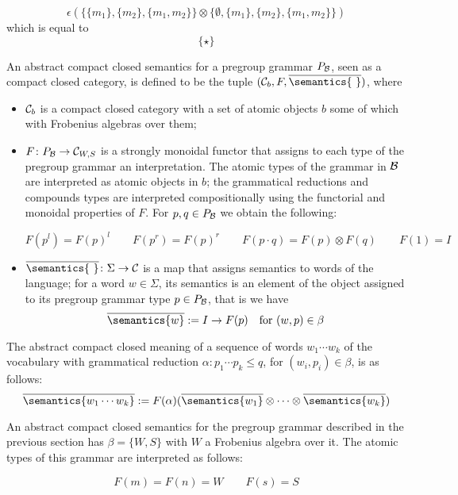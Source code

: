 \[
\epsilon(\{\{m_1\}, \{m_2\}, \{m_1,m_2\}\} \otimes   \{\emptyset, \{m_1\}, \{m_2\}, \{m_1, m_2\}\})
\]
which is equal to 
\[
\{\star\}
\]
 







An abstract compact closed semantics for a pregroup grammar $P_{\cal B}$, seen as a compact closed category,   is defined  to be the tuple $({\cal C}_{b},F, \overline{\semantics{\ }})$, where 
\begin{itemize}
\item ${\cal C}_{b}$ is a compact closed category with  a set of atomic  objects $b$ some of which with  Frobenius algebras over them;
\item $F \colon P_{\cal B} \to {\cal C}_{W, S}$  is a strongly monoidal functor that assigns to each type  of the pregroup grammar an interpretation. The atomic types of the grammar in ${\cal B}$ are interpreted as atomic objects in $b$; the grammatical reductions and compounds types are interpreted compositionally using the functorial and monoidal properties of $F$. For  $p,q \in P_{\cal B}$ we obtain the following:

\[
F(p^l) = F(p)^l \qquad 
F(p^r) = F(p)^r\qquad
F(p \cdot q) = F(p) \otimes F(q)\qquad
F(1) =  I 
\]
\item $\overline{\semantics{\ }} \colon \Sigma \to {\cal C}$ is a map that assigns semantics to  words of the language; for a word  $w  \in \Sigma$, its semantics  is an element of the object assigned to its pregroup grammar type $p \in P_{\cal B}$, that is we have
\[
\overline{\semantics{w}} := I \to F(p) \quad \text{for} \ (w, p) \in \beta
\]
\end{itemize}

\noindent
The abstract compact closed meaning of a sequence of words $w_1 \cdots w_k$  of the vocabulary with grammatical reduction $\alpha \colon p_1 \cdots p_k \leq q$, for $(w_i, p_i) \in \beta$,  is as follows:
\[
\overline{\semantics{w_1 \cdots w_k}} := F(\alpha)(\overline{\semantics{w_1}} \otimes \cdots \otimes \overline{\semantics{w_k}})
\]


An abstract compact closed semantics for the pregroup grammar described in the previous section has $\beta = \{W, S\}$ with $W$ a Frobenius algebra over it. The atomic types of this grammar  are interpreted as follows:

\[
F(m) = F(n) = W \qquad
F(s) = S
\]

